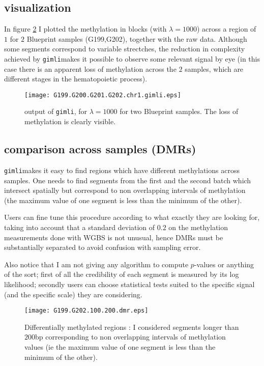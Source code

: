 \documentclass[11pt]{amsart}
\newcommand{\gimli}{\texttt{gimli}}
\begin{document}
\subsection{visualization}

In figure \ref{ex1} I plotted the methylation in blocks (with $\lambda=1000$) 
across a region of $1$ for $2$ Blueprint samples
(G199,G202), together with the raw data.  Although some segments
correspond to variable strectches, the reduction in complexity achieved by \gimli makes it 
possible to observe some relevant signal by eye (in this case there is 
an apparent loss of methylation across the $2$ samples, which are different 
stages in the hematopoietic process).

\begin{figure}\label{ex1}
\texttt{[image: G199.G200.G201.G202.chr1.gimli.eps]}
\caption{output of \gimli, for $\lambda=1000$ for two Blueprint samples. The loss of
methylation is clearly visible.}
\end{figure}

\subsection{comparison across samples (DMRs)}

\gimli  makes it easy to find regions which have different 
methylations across samples. One needs to find segments 
from the first and the second batch which intersect spatially
but correspond to non overlapping intervals of methylation 
(the maximum value of one 
segment is less than the minimum of the other).

Users can fine tune this procedure according to what exactly they 
are looking for, taking into account that a standard deviation of $0.2$
on the methylation measurements done with WGBS is not unusual, hence
DMRs must be substantially separated to avoid confusion with sampling error.

Also notice that I am not giving any algorithm to compute $p$-values
or anything of the sort; first of all the credibility of each segment
is measured by its log likelihood; secondly users can choose statistical
tests suited to the specific signal (and the specific scale)
they are considering.

\begin{figure}\label{ex1}
\texttt{[image: G199.G202.100.200.dmr.eps]}
\caption{Differentially methylated regions : I considered segments longer than $200$bp 
corresponding to
non overlapping intervals of methylation values (ie the maximum value of one 
segment is less than the minimum of the other).}
\end{figure}
\end{document}
